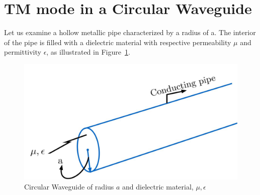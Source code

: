 \section{TM mode in a Circular Waveguide}
Let us examine a hollow metallic pipe characterized by a radius of a. The interior of the pipe is filled with a dielectric material with respective permeability $\mu$ and permittivity $\epsilon$, as illustrated in Figure~\ref{fig:fig3}.
\begin{figure}[h]
\centering
\includegraphics[width=0.7\linewidth]{./graphics/fig_3.1}
\caption{Circular Waveguide of radius $a$ and dielectric material, $\mu, \epsilon$}
\label{fig:fig3}
\end{figure}

